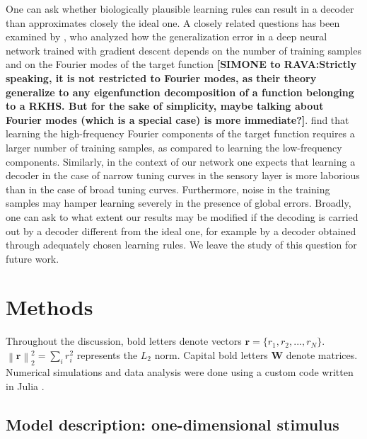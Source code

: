 \documentclass[a4paper]{article}%
\begin{document}
One can ask whether biologically plausible learning rules can result in a
decoder than approximates closely the ideal one. A closely related questions
has been examined by  \cite{Bordelon2020SpectrumNetworks}, who
analyzed how the generalization error in a deep neural network trained with
gradient descent depends on the number of training samples and on
the Fourier modes of the target function
\textbf{[SIMONE to RAVA:Strictly speaking, it is not restricted to Fourier modes, as their theory generalize to any eigenfunction decomposition of a function belonging to a RKHS. But for the sake of simplicity, maybe talking about Fourier modes (which is a special case) is more immediate?]}. 
\cite{Bordelon2021PopulationBias} find that
learning the high-frequency Fourier components of the target function requires
a larger number of training samples, as compared to learning the low-frequency
components.
Similarly, in the context of our network one expects that learning a decoder
in the case of narrow tuning curves in the sensory layer is more laborious
than in the case of broad tuning curves. Furthermore, noise in the training
samples may hamper learning severely in the presence of global errors.
Broadly, one can ask to what extent our results may be modified if the
decoding is carried out by a decoder different from the ideal one, for example
by a decoder obtained through adequately chosen learning rules. We leave the
study of this question for future work.

\section{Methods}

\label{Se:Me} Throughout the discussion, bold letters denote vectors
$\mathbf{r} = \{r_{1},r_{2},...,r_{N} \}$. $\left\|  \mathbf{r} \right\|
_{2}^{2} = \sum_{i} r_{i}^{2}$ represents the $L_{2}$ norm. Capital bold
letters $\mathbf{W}$ denote matrices. Numerical simulations and data analysis
were done using a custom code written in Julia
\cite[]{Bezanson2017Julia:Computing}.

\subsection*{Model description: one-dimensional stimulus}
\end{document}
